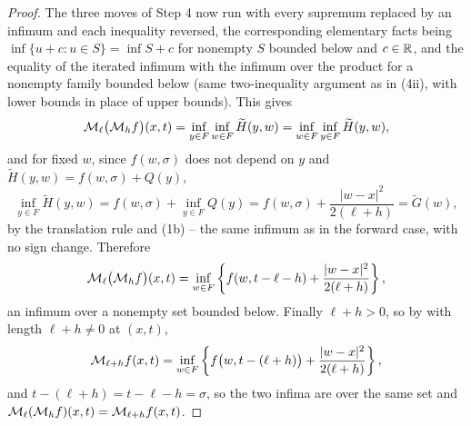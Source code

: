 \begin{proof}
The three moves of Step 4 now run with every supremum replaced by an infimum
and each inequality reversed, the corresponding elementary facts being
$\inf\{u+c:u\in S\}=\inf S+c$ for nonempty $S$ bounded below and $c\in\mathbb{R}$, and
the equality of the iterated infimum with the infimum over the product for a
nonempty family bounded below (same two-inequality argument as in (4ii), with
lower bounds in place of upper bounds). This gives
\[
  \mathcal{M}_\ell\bigl(\mathcal{M}_hf\bigr)(x,t)
   =\inf_{y\in F}\inf_{w\in F}\widetilde H(y,w)
   =\inf_{w\in F}\inf_{y\in F}\widetilde H(y,w),
\]
and for fixed $w$, since $f(w,\sigma)$ does not depend on $y$ and
$\widetilde H(y,w)=f(w,\sigma)+Q(y)$,
\[
  \inf_{y\in F}\widetilde H(y,w)=f(w,\sigma)+\inf_{y\in F}Q(y)
   =f(w,\sigma)+\frac{|w-x|^2}{2(\ell+h)}=\widetilde G(w),
\]
by the translation rule and (1b) -- the same infimum as in the forward case,
with no sign change. Therefore
\[
  \mathcal{M}_\ell\bigl(\mathcal{M}_hf\bigr)(x,t)
   =\inf_{w\in F}\left\{f(w,t-\ell-h)+\frac{|w-x|^2}{2(\ell+h)}\right\},
\]
an infimum over a nonempty set bounded below. Finally $\ell+h>0$, so by
 with length $\ell+h\ne0$ at $(x,t)$,
\[
  \mathcal{M}_{\ell+h}f(x,t)
   =\inf_{w\in F}\left\{f\bigl(w,t-(\ell+h)\bigr)
      +\frac{|w-x|^2}{2(\ell+h)}\right\},
\]
and $t-(\ell+h)=t-\ell-h=\sigma$, so the two infima are over the same set and
$\mathcal{M}_\ell(\mathcal{M}_hf)(x,t)=\mathcal{M}_{\ell+h}f(x,t)$.
\end{proof}
